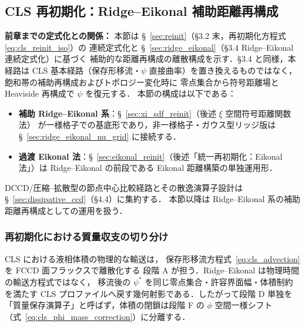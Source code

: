 \subsection{CLS 再初期化：Ridge--Eikonal 補助距離再構成}
\label{sec:cls_compression}

\noindent\textbf{前章までの定式化との関係：}
本節は §~\ref{sec:reinit}（§3.2 末，再初期化方程式 \eqref{eq:cls_reinit_iso}）の
連続定式化と §~\ref{sec:ridge_eikonal}（§3.4 Ridge--Eikonal 連続定式化）に基づく
補助的な距離再構成の離散構成を示す．§3.4 と同様，本経路は
CLS 基本経路（保存形移流・$\psi$ 直接曲率）を置き換えるものではなく，
飽和帯の補助再構成およびトポロジー変化時に
零点集合から符号距離場と Heaviside 再構成で $\psi$ を復元する．
本節の構成は以下である：
\begin{itemize}
  \item \textbf{補助 Ridge--Eikonal 系}：§~\ref{sec:xi_sdf_reinit}（後述 $\xi$ 空間符号距離関数法）
        が一様格子での基底形であり，非一様格子・ガウス型リッジ版は
        §~\ref{sec:ridge_eikonal_nu_grid} に接続する．
  \item \textbf{過渡 Eikonal 法}：§~\ref{sec:eikonal_reinit}（後述「統一再初期化：Eikonal 法」）は
        Ridge--Eikonal の前段である Eikonal 距離構築の単独運用形．
\end{itemize}
DCCD/圧縮--拡散型の節点中心比較経路とその散逸演算子設計は
§~\ref{sec:dissipative_ccd}（§4.4）に集約する．
本節以降は Ridge--Eikonal 系の補助距離再構成としての運用を扱う．

\label{sec:cls_compression_legacy}%
\label{alg:cls_reinit_dccd}%


\subsubsection{再初期化における質量収支の切り分け}
\label{sec:dccd_mass_conservation}%

CLS における液相体積の物理的な輸送は，
保存形移流方程式~\eqref{eq:cls_advection} を FCCD 面フラックスで離散化する
段階 A が担う．Ridge--Eikonal は物理時間の輸送方程式ではなく，
移流後の $\psi^\ast$ を同じ零点集合・許容界面幅・体積制約を満たす
CLS プロファイルへ戻す幾何射影である．したがって段階 D 単独を
「質量保存演算子」と呼ばず，体積の閉鎖は段階 F の
$\phi$ 空間一様シフト（式~\eqref{eq:cls_phi_mass_correction}）に分離する．

